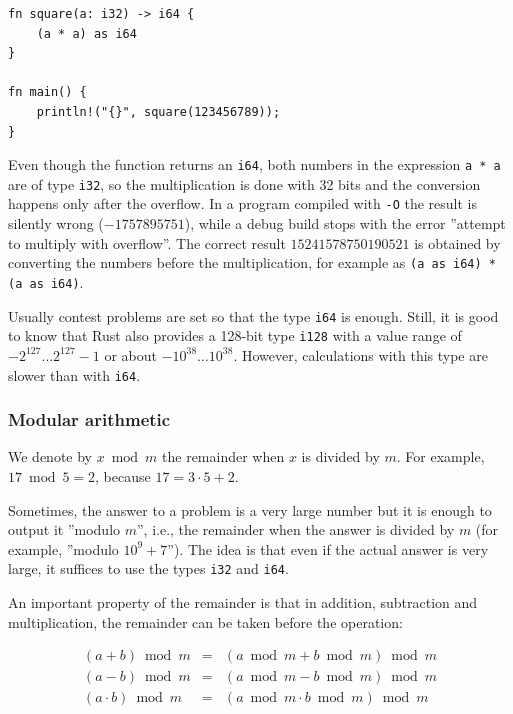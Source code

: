 \begin{lstlisting}
fn square(a: i32) -> i64 {
    (a * a) as i64
}

fn main() {
    println!("{}", square(123456789));
}
\end{lstlisting}

Even though the function returns an \texttt{i64},
both numbers in the expression \texttt{a * a}
are of type \texttt{i32}, so the multiplication
is done with 32 bits and the conversion happens
only after the overflow.
In a program compiled with \texttt{-O}
the result is silently wrong ($-1757895751$),
while a debug build stops with the error
''attempt to multiply with overflow''.
The correct result $15241578750190521$ is obtained
by converting the numbers before the multiplication,
for example as \texttt{(a as i64) * (a as i64)}.

Usually contest problems are set so that the
type \texttt{i64} is enough.
Still, it is good to know that
Rust also provides
a 128-bit type \texttt{i128}
with a value range of
$-2^{127} \ldots 2^{127}-1$ or about
$-10^{38} \ldots 10^{38}$.
However, calculations with this type are
slower than with \texttt{i64}.

\subsubsection{Modular arithmetic}


We denote by $x \bmod m$ the remainder
when $x$ is divided by $m$.
For example, $17 \bmod 5 = 2$,
because $17 = 3 \cdot 5 + 2$.

Sometimes, the answer to a problem is a
very large number but it is enough to
output it ''modulo $m$'', i.e.,
the remainder when the answer is divided by $m$
(for example, ''modulo $10^9+7$'').
The idea is that even if the actual answer
is very large,
it suffices to use the types
\texttt{i32} and \texttt{i64}.

An important property of the remainder is that
in addition, subtraction and multiplication,
the remainder can be taken before the operation:

\[
\begin{array}{rcr}
(a+b) \bmod m & = & (a \bmod m + b \bmod m) \bmod m \\
(a-b) \bmod m & = & (a \bmod m - b \bmod m) \bmod m \\
(a \cdot b) \bmod m & = & (a \bmod m \cdot b \bmod m) \bmod m
\end{array}
\]

